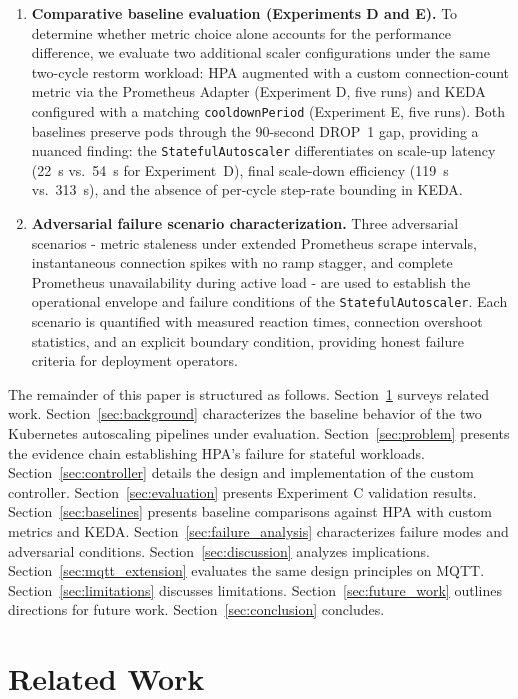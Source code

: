 \documentclass[twocolumn]{svjour3}
\begin{document}
\begin{enumerate}[leftmargin=*]
\item \textbf{Comparative baseline evaluation (Experiments D and E).} To determine whether metric choice alone accounts for the performance difference, we evaluate two additional scaler configurations under the same two-cycle restorm workload: HPA augmented with a custom connection-count metric via the Prometheus Adapter (Experiment D, five runs) and KEDA configured with a matching \texttt{cooldownPeriod} (Experiment E, five runs). Both baselines preserve pods through the 90-second DROP~1 gap, providing a nuanced finding: the \texttt{StatefulAutoscaler} differentiates on scale-up latency (22~s vs.\ 54~s for Experiment~D), final scale-down efficiency (119~s vs.\ 313~s), and the absence of per-cycle step-rate bounding in KEDA.

\item \textbf{Adversarial failure scenario characterization.} Three adversarial scenarios - metric staleness under extended Prometheus scrape intervals, instantaneous connection spikes with no ramp stagger, and complete Prometheus unavailability during active load - are used to establish the operational envelope and failure conditions of the \texttt{StatefulAutoscaler}. Each scenario is quantified with measured reaction times, connection overshoot statistics, and an explicit boundary condition, providing honest failure criteria for deployment operators.
\end{enumerate}

The remainder of this paper is structured as follows. Section~\ref{sec:related} surveys related work. Section~\ref{sec:background} characterizes the baseline behavior of the two Kubernetes autoscaling pipelines under evaluation. Section~\ref{sec:problem} presents the evidence chain establishing HPA's failure for stateful workloads. Section~\ref{sec:controller} details the design and implementation of the custom controller. Section~\ref{sec:evaluation} presents Experiment C validation results. Section~\ref{sec:baselines} presents baseline comparisons against HPA with custom metrics and KEDA. Section~\ref{sec:failure_analysis} characterizes failure modes and adversarial conditions. Section~\ref{sec:discussion} analyzes implications. Section~\ref{sec:mqtt_extension} evaluates the same design principles on MQTT. Section~\ref{sec:limitations} discusses limitations. Section~\ref{sec:future_work} outlines directions for future work. Section~\ref{sec:conclusion} concludes.


\section{Related Work}
\label{sec:related}
\end{document}
